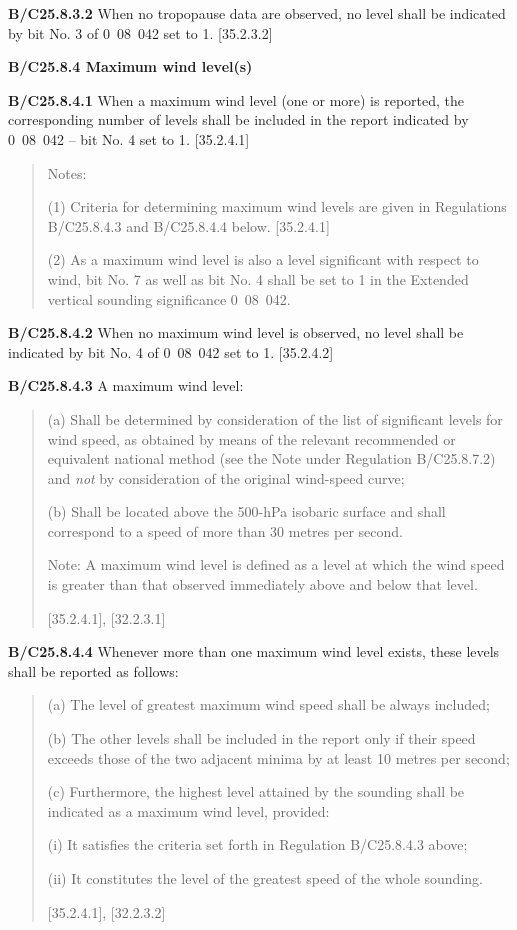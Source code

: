 \textbf{B/C25.8.3.2} When no tropopause data are observed, no level shall be indicated by bit No. 3 of 0~08~042 set to 1. {[}35.2.3.2{]}

\textbf{B/C25.8.4 Maximum wind level(s)}

\textbf{B/C25.8.4.1} When a maximum wind level (one or more) is reported, the corresponding number of levels shall be included in the report indicated by 0~08~042 -- bit No. 4 set to 1\emph{.} {[}35.2.4.1{]}

\begin{quote}
Notes:

(1) Criteria for determining maximum wind levels are given in Regulations B/C25.8.4.3 and B/C25.8.4.4 below. {[}35.2.4.1{]}

(2) As a maximum wind level is also a level significant with respect to wind, bit No. 7 as well as bit No. 4 shall be set to 1 in the Extended vertical sounding significance 0~08~042.
\end{quote}

\textbf{B/C25.8.4.2} When no maximum wind level is observed, no level shall be indicated by bit No. 4 of 0~08~042 set to 1. {[}35.2.4.2{]}

\textbf{B/C25.8.4.3} A maximum wind level:

\begin{quote}
(a) Shall be determined by consideration of the list of significant levels for wind speed, as obtained by means of the relevant recommended or equivalent national method (see the Note under Regulation B/C25.8.7.2) and \emph{not} by consideration of the original wind-speed curve;

(b) Shall be located above the 500-hPa isobaric surface and shall correspond to a speed of more than 30 metres per second.

Note: A maximum wind level is defined as a level at which the wind speed is greater than that observed immediately above and below that level.

{[}35.2.4.1{]}, {[}32.2.3.1{]}
\end{quote}

\textbf{B/C25.8.4.4} Whenever more than one maximum wind level exists, these levels shall be reported as follows:

\begin{quote}
(a) The level of greatest maximum wind speed shall be always included;

(b) The other levels shall be included in the report only if their speed exceeds those of the two adjacent minima by at least 10 metres per second;

(c) Furthermore, the highest level attained by the sounding shall be indicated as a maximum wind level, provided:

(i) It satisfies the criteria set forth in Regulation B/C25.8.4.3 above;

(ii) It constitutes the level of the greatest speed of the whole sounding.

{[}35.2.4.1{]}, {[}32.2.3.2{]}
\end{quote}

